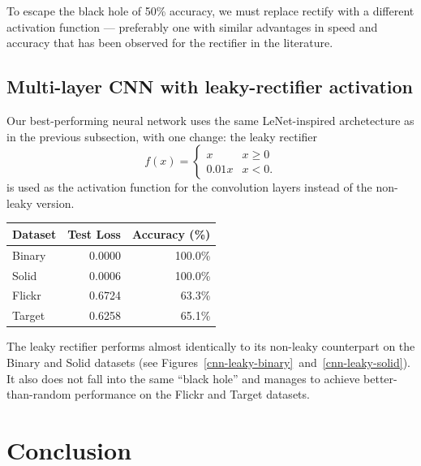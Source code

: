\documentclass{article}
\newcommand{\dataset}[1]{\textsf{#1}}
\begin{document}
    To escape the black hole of 50\% accuracy, we must replace rectify with a different activation function --- preferably one with similar advantages in speed and accuracy that has been observed for the rectifier in the literature.



  \subsection{Multi-layer CNN with leaky-rectifier activation}

    Our best-performing neural network uses the same LeNet-inspired archetecture as in the previous subsection, with one change: the leaky rectifier
    \[ f(x) = \begin{cases} x & x \geq 0 \\ 0.01 x & x < 0. \end{cases} \]
    is used as the activation function for the convolution layers instead of the non-leaky version.

    \begin{table}[h]
      \centering
      \begin{tabular}{lrr}\toprule
        \textbf{Dataset} & \textbf{Test Loss} & \textbf{Accuracy (\%)}\\\midrule
        \dataset{Binary} & 0.0000 & 100.0\% \\ %
        \dataset{Solid}  & 0.0006 & 100.0\% \\ %
        \dataset{Flickr} & 0.6724 &  63.3\% \\ %
        \dataset{Target} & 0.6258 &  65.1\% \\ %
        \bottomrule
      \end{tabular}
    \end{table}

    The leaky rectifier performs almost identically to its non-leaky counterpart on the \dataset{Binary} and \dataset{Solid} datasets (see Figures~\ref{cnn-leaky-binary}~and~\ref{cnn-leaky-solid}). It also does not fall into the same ``black hole'' and manages to achieve better-than-random performance on the \dataset{Flickr} and \dataset{Target} datasets.


\section{Conclusion}
\end{document}
